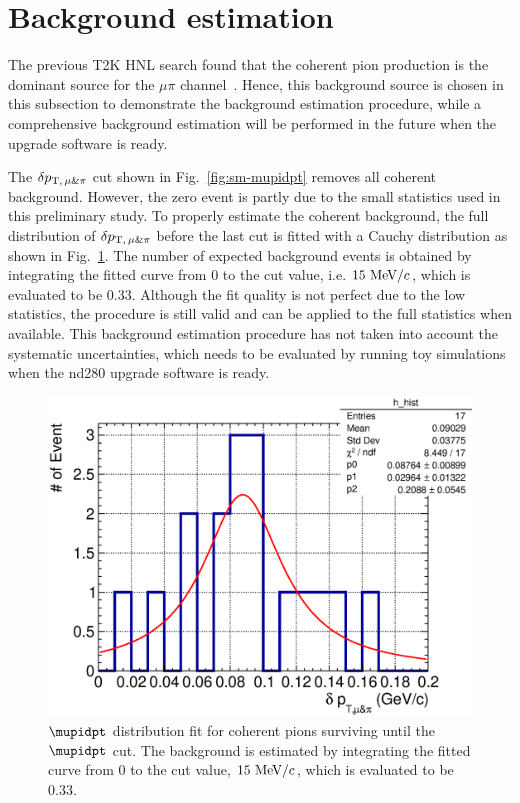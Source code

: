     
    \section{Background estimation}
    \label{sec:hnl-bkg}
        The previous T2K HNL search found that the coherent pion production is the dominant source for the $\mu\pi$ channel~\cite{T2K:2019jwa}.
        Hence, this background source is chosen in this subsection to demonstrate the background estimation procedure, while a comprehensive background estimation will be performed in the future when the upgrade software is ready.
        
        The $\delta p_{\textrm{T},\,\mu\&\pi}$ cut shown in Fig.~\ref{fig:sm-mupidpt} removes all coherent background. 
        However, the zero event is partly due to the small statistics used in this preliminary study.
        To properly estimate the coherent background, the full distribution of $\delta p_{\textrm{T},\,\mu\&\pi}$ before the last cut is fitted with a Cauchy distribution as shown in Fig.~\ref{fig:coh-bkg}.
        The number of expected background events is obtained by integrating the fitted curve from $0$ to the cut value, i.e. $15~\textrm{MeV}/c$, which is evaluated to be $0.33$. 
        Although the fit quality is not perfect due to the low statistics, the procedure is still valid and can be applied to the full statistics when available.
        This background estimation procedure has not taken into account the systematic uncertainties, which needs to be evaluated by running toy simulations when the nd280 upgrade software is ready.
        \begin{figure}[!htb] 
            \centering
            \includegraphics[width=0.5\linewidth]{figures/hnl/hnl_sfgmu_mpdpt_hist_al-1_SM_COH_zoom_fit.eps}
            \caption{$\mupidpt$ distribution fit for coherent pions surviving until the $\mupidpt$ cut. The background is estimated by integrating the fitted curve from $0$ to the cut value, $15~\textrm{MeV}/c$, which is evaluated to be $0.33$.}
            \label{fig:coh-bkg}
        \end{figure}    
    
